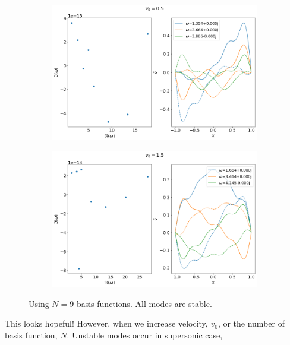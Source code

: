 \documentclass{article}
\begin{document}
\begin{figure}[H]
    \centering
    \begin{subfigure}[b]{0.45\linewidth}
        \includegraphics[width=\linewidth]{img/results-sine-dvr-N=9,v0=0.5.png}
        \caption{}
    \end{subfigure}%
    \begin{subfigure}[b]{0.45\linewidth}
        \includegraphics[width=\linewidth]{img/results-sine-dvr-N=9,v0=1.5.png}
        \caption{}
    \end{subfigure}
    \caption{Using $N=9$ basis functions. All modes are stable.}
    \label{fig:results-sine-dvr}
\end{figure}
This looks hopeful! However, when we increase velocity, $v_0$, or the number of basis function, $N$. Unstable modes occur in supersonic case,
\end{document}
